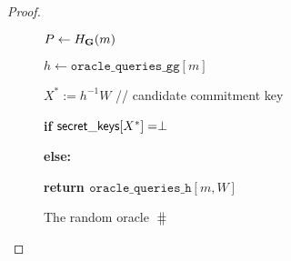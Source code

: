 \begin{proof}
\begin{itemize}
\begin{figure}
\begin{minipage}{7cm}
{{					%
					
					
					{$ P \leftarrow H_{\mathbf{G}}(m) $}
					
					{$ h \leftarrow \mathtt{oracle\_queries\_gg}[m] $}
					
					{$ X^* := h^{-1}W $ // candidate commitment key} 
					
					{{\textbf{if} ${\mathsf{secret\_keys}}[X^*] = \perp$ }} 
					
					
					\tabdbl{$ \pk^* \leftsample \grE $} %
					
					\tabdbl{$ \pkeys[X^*] \leftarrow \pk^* $}
					
					
					
					
					
					{\textbf{else:} }
					
					
					
					
					\textbf{return $  \mathtt{oracle\_queries\_h}[m,  W] $}
					
			}}	
			\caption{The random oracle $ \hash $}
			\label{oracle:HnoPK}
		\end{minipage}
		\end{figure}
		

\end{itemize}
\end{proof}
